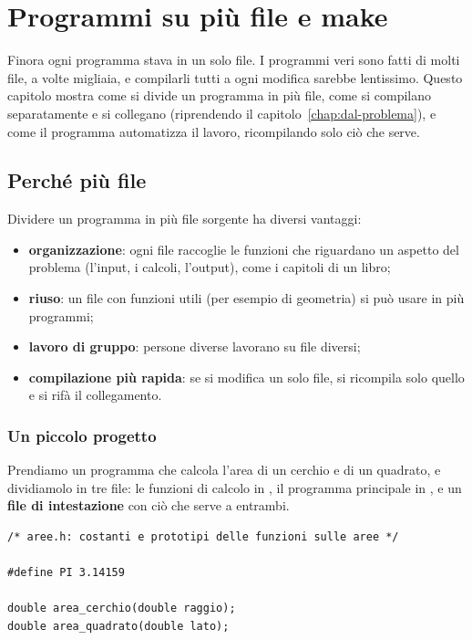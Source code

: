 \chapter{Programmi su più file e make}
\label{chap:make}

Finora ogni programma stava in un solo file. I programmi veri sono fatti di
molti file, a volte migliaia, e compilarli tutti a ogni modifica sarebbe
lentissimo. Questo capitolo mostra come si divide un programma in più file,
come si compilano separatamente e si collegano (riprendendo il
capitolo~\ref{chap:dal-problema}), e come il programma  automatizza
il lavoro, ricompilando solo ciò che serve.

\section{Perché più file}

Dividere un programma in più file sorgente ha diversi vantaggi:

\begin{itemize}
  \item \textbf{organizzazione}: ogni file raccoglie le funzioni che
        riguardano un aspetto del problema (l'input, i calcoli, l'output),
        come i capitoli di un libro;
  \item \textbf{riuso}: un file con funzioni utili (per esempio di
        geometria) si può usare in più programmi;
  \item \textbf{lavoro di gruppo}: persone diverse lavorano su file
        diversi;
  \item \textbf{compilazione più rapida}: se si modifica un solo file, si
        ricompila solo quello e si rifà il collegamento.
\end{itemize}

\subsection{Un piccolo progetto}

Prendiamo un programma che calcola l'area di un cerchio e di un quadrato, e
dividiamolo in tre file: le funzioni di calcolo in , il
programma principale in , e un \textbf{file di intestazione}
 con ciò che serve a entrambi.

\begin{lstlisting}[style=h, name=aree.h]
/* aree.h: costanti e prototipi delle funzioni sulle aree */

#define PI 3.14159

double area_cerchio(double raggio);
double area_quadrato(double lato);
\end{lstlisting}

